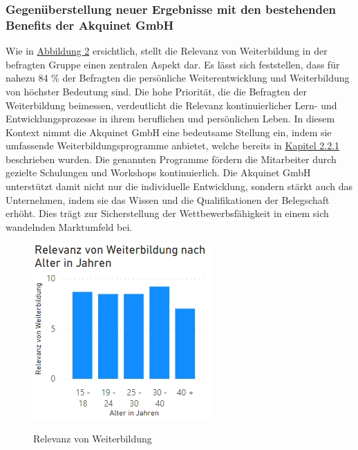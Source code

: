 \subsubsection{Gegenüberstellung neuer Ergebnisse mit den bestehenden Benefits der Akquinet GmbH}
Wie in \hyperref[abb:weiterbildung]{Abbildung 2} ersichtlich, stellt die Relevanz von Weiterbildung in der befragten Gruppe einen zentralen Aspekt dar. Es lässt sich feststellen, dass für nahezu 84 \% der Befragten die persönliche Weiterentwicklung und Weiterbildung von höchster Bedeutung sind. Die hohe Priorität, die die Befragten der Weiterbildung beimessen, verdeutlicht die Relevanz kontinuierlicher Lern- und Entwicklungsprozesse in ihrem beruflichen und persönlichen Leben.\newline
In diesem Kontext nimmt die Akquinet GmbH eine bedeutsame Stellung ein, indem sie umfassende Weiterbildungsprogramme anbietet, welche bereits in \hyperref[sec:weiterbildung]{Kapitel 2.2.1} beschrieben wurden. Die genannten Programme fördern die Mitarbeiter durch gezielte Schulungen und Workshops kontinuierlich.\newline
Die Akquinet GmbH unterstützt damit nicht nur die individuelle Entwicklung, sondern stärkt auch das Unternehmen, indem sie das Wissen und die Qualifikationen der Belegschaft erhöht. Dies trägt zur Sicherstellung der Wettbewerbsfähigkeit in einem sich wandelnden Marktumfeld bei.
\begin{figure}[H]
    \centering
    \includegraphics[scale = 0.7]{fig/Weiterbildung.png}
    \label{abb:weiterbildung}
    \caption{Relevanz von Weiterbildung}
\end{figure}

